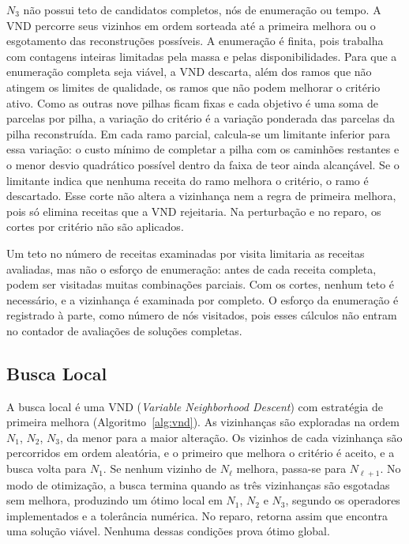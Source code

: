 \documentclass[conference]{IEEEtran}
\begin{document}
$N_3$ não possui teto de candidatos completos, nós de enumeração ou tempo. A VND percorre seus vizinhos em ordem sorteada até a primeira melhora ou o esgotamento das reconstruções possíveis. A enumeração é finita, pois trabalha com contagens inteiras limitadas pela massa e pelas disponibilidades. Para que a enumeração completa seja viável, a VND descarta, além dos ramos que não atingem os limites de qualidade, os ramos que não podem melhorar o critério ativo. Como as outras nove pilhas ficam fixas e cada objetivo é uma soma de parcelas por pilha, a variação do critério é a variação ponderada das parcelas da pilha reconstruída. Em cada ramo parcial, calcula-se um limitante inferior para essa variação: o custo mínimo de completar a pilha com os caminhões restantes e o menor desvio quadrático possível dentro da faixa de teor ainda alcançável. Se o limitante indica que nenhuma receita do ramo melhora o critério, o ramo é descartado. Esse corte não altera a vizinhança nem a regra de primeira melhora, pois só elimina receitas que a VND rejeitaria. Na perturbação e no reparo, os cortes por critério não são aplicados.

Um teto no número de receitas examinadas por visita limitaria as receitas avaliadas, mas não o esforço de enumeração: antes de cada receita completa, podem ser visitadas muitas combinações parciais. Com os cortes, nenhum teto é necessário, e a vizinhança é examinada por completo. O esforço da enumeração é registrado à parte, como número de nós visitados, pois esses cálculos não entram no contador de avaliações de soluções completas.

\subsection{Busca Local}

A busca local é uma VND (\textit{Variable Neighborhood Descent}) com estratégia de primeira melhora (Algoritmo~\ref{alg:vnd}). As vizinhanças são exploradas na ordem $N_1$, $N_2$, $N_3$, da menor para a maior alteração. Os vizinhos de cada vizinhança são percorridos em ordem aleatória, e o primeiro que melhora o critério é aceito, e a busca volta para $N_1$. Se nenhum vizinho de $N_\ell$ melhora, passa-se para $N_{\ell+1}$. No modo de otimização, a busca termina quando as três vizinhanças são esgotadas sem melhora, produzindo um ótimo local em $N_1$, $N_2$ e $N_3$, segundo os operadores implementados e a tolerância numérica. No reparo, retorna assim que encontra uma solução viável. Nenhuma dessas condições prova ótimo global.
\end{document}
